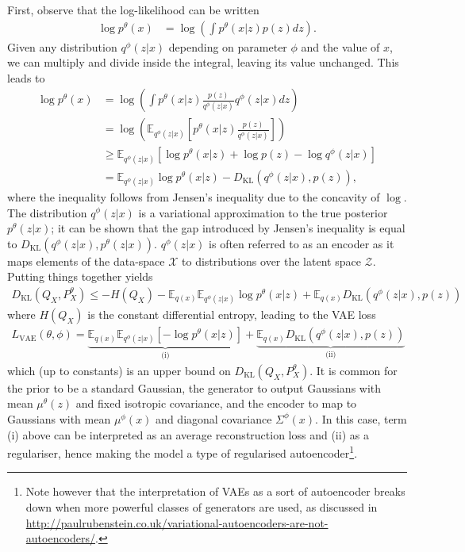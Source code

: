 First, observe that the log-likelihood can be written 
%
\begin{align*}
\log p^\theta(x) &= \log \left( \int p^\theta(x|z) p(z) dz \right).
\end{align*}
%
Given any distribution $q^\phi(z|x)$ depending on parameter $\phi$ and the value of $x$, we can multiply and divide inside the integral, leaving its value unchanged.
This leads to
%
\begin{align*}
\log p^\theta(x) &= \log \left( \int p^\theta(x|z) \frac{p(z)}{q^\phi(z|x)} q^\phi(z|x) dz \right) \\
&= \log \left( \mathbb{E}_{q^\phi(z|x)} \left[  p^\theta(x|z) \frac{p(z)}{q^\phi(z|x)} \right]\right) \\
&\geq \mathbb{E}_{q^\phi(z|x)} \left[ \log p^\theta(x|z) + \log p(z) - \log q^\phi(z|x) \right] \\
&= \mathbb{E}_{q^\phi(z|x)} \log p^\theta(x|z)  - D_{\text{KL}}\left(q^\phi(z|x), p(z)\right),
\end{align*}
%
where the inequality follows from Jensen's inequality due to the concavity of $\log$.
The distribution $q^\phi(z|x)$ is a variational approximation to the true posterior $p^\theta(z|x)$; it can be shown that the gap introduced by Jensen's inequality is equal to $D_{\text{KL}}\left(q^\phi(z|x), p^\theta(z|x)\right)$. 
$q^\phi(z|x)$ is often referred to as an encoder as it maps elements of the data-space $\mathcal{X}$ to distributions over the latent space $\mathcal{Z}$.
Putting things together yields
%
\begin{align*}
D_{\text{KL}}(Q_X, P^\theta_X) \leq -H(Q_X)  - \mathbb{E}_{q(x)} \mathbb{E}_{q^\phi(z|x)} \log p^\theta(x|z) + \mathbb{E}_{q(x)}D_{\text{KL}}\left(q^\phi(z|x), p(z)\right)
\end{align*}
%
where $H(Q_X)$ is the constant differential entropy, leading to the VAE loss
%
\begin{align}
L_{\text{VAE}}(\theta, \phi) =  \underbrace{\mathbb{E}_{q(x)} \mathbb{E}_{q^\phi(z|x)} \left[ - \log p^\theta(x|z)\right]}_{\text{(i)}} + \underbrace{\mathbb{E}_{q(x)}D_{\text{KL}}\left(q^\phi(z|x), p(z)\right)}_{\text{(ii)}}
\end{align}
%
which (up to constants) is an upper bound on $D_{\text{KL}}(Q_X, P^\theta_X)$.
It is common for the prior to be a standard Gaussian, the generator to output Gaussians with mean $\mu^\theta(z)$ and fixed isotropic covariance, and the encoder to map to Gaussians with mean $\mu^\phi(x)$ and diagonal covariance $\Sigma^\phi(x)$.
In this case, term (i) above can be interpreted as an average reconstruction loss and (ii) as a regulariser, hence making the model a type of regularised autoencoder\footnote{Note however that the interpretation of VAEs as a sort of autoencoder breaks down when more powerful classes of generators are used, as discussed in \href{http://paulrubenstein.co.uk/variational-autoencoders-are-not-autoencoders/}{http://paulrubenstein.co.uk/variational-autoencoders-are-not-autoencoders/}.}.

